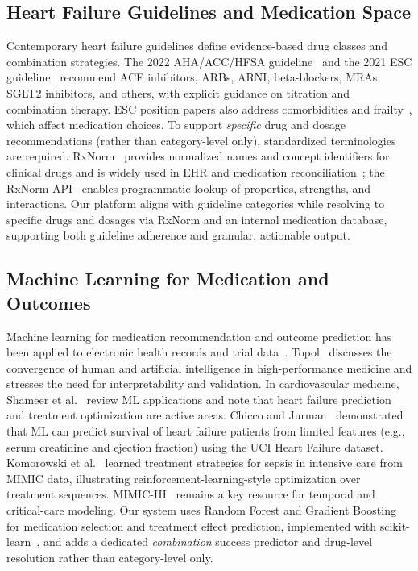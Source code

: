 \documentclass[conference]{IEEEtran}
\begin{document}
\subsection{Heart Failure Guidelines and Medication Space}
Contemporary heart failure guidelines define evidence-based drug classes and combination strategies. The 2022 AHA/ACC/HFSA guideline~\cite{heidenreich2022aha} and the 2021 ESC guideline~\cite{mcdonagh2021esc} recommend ACE inhibitors, ARBs, ARNI, beta-blockers, MRAs, SGLT2 inhibitors, and others, with explicit guidance on titration and combination therapy. ESC position papers also address comorbidities and frailty~\cite{ambrosetti2021esc}, which affect medication choices. To support \emph{specific} drug and dosage recommendations (rather than category-level only), standardized terminologies are required. RxNorm~\cite{nelson2002rxnorm} provides normalized names and concept identifiers for clinical drugs and is widely used in EHR and medication reconciliation~\cite{sterling2016rxnorm}; the RxNorm API~\cite{rxnormapi} enables programmatic lookup of properties, strengths, and interactions. Our platform aligns with guideline categories while resolving to specific drugs and dosages via RxNorm and an internal medication database, supporting both guideline adherence and granular, actionable output.

\subsection{Machine Learning for Medication and Outcomes}
Machine learning for medication recommendation and outcome prediction has been applied to electronic health records and trial data~\cite{rajkomar2019scalable}. Topol~\cite{topol2019high} discusses the convergence of human and artificial intelligence in high-performance medicine and stresses the need for interpretability and validation. In cardiovascular medicine, Shameer et al.~\cite{shameer2018mlhf} review ML applications and note that heart failure prediction and treatment optimization are active areas. Chicco and Jurman~\cite{chicco2020uci} demonstrated that ML can predict survival of heart failure patients from limited features (e.g., serum creatinine and ejection fraction) using the UCI Heart Failure dataset. Komorowski et al.~\cite{komorowski2018ai} learned treatment strategies for sepsis in intensive care from MIMIC data, illustrating reinforcement-learning-style optimization over treatment sequences. MIMIC-III~\cite{johnson2016mimic} remains a key resource for temporal and critical-care modeling. Our system uses Random Forest and Gradient Boosting~\cite{breiman2001random,friedman2001greedy} for medication selection and treatment effect prediction, implemented with scikit-learn~\cite{scikit}, and adds a dedicated \emph{combination} success predictor and drug-level resolution rather than category-level only.
\end{document}
